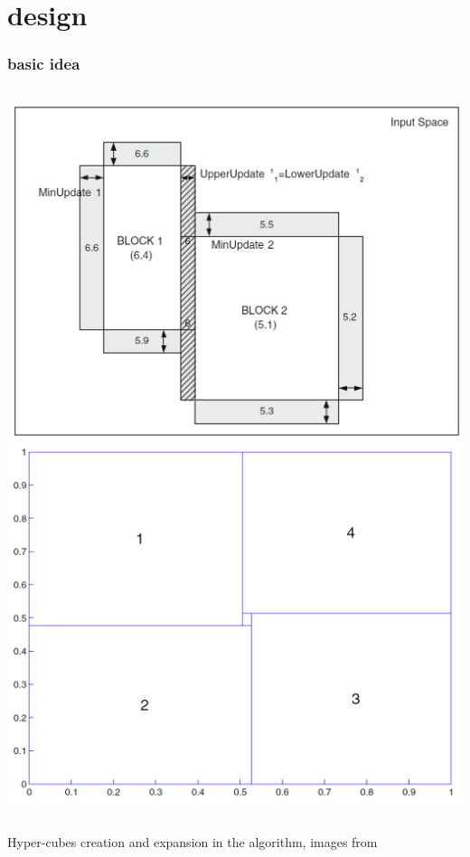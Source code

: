 \documentclass[presentation]{beamer}
\begin{document}
\section{\gridex design}

\begin{frame}%
\frametitle{\iter basic idea}
	\begin{columns}[t]
			\centering
			\includegraphics[width = \columnwidth]{img/cubes.png}
			\centering
			\includegraphics[width = \columnwidth]{img/iter.png}
	\end{columns}
	\centering
	Hyper-cubes creation and expansion in the \iter algorithm, images from 
\end{frame}
\end{document}
